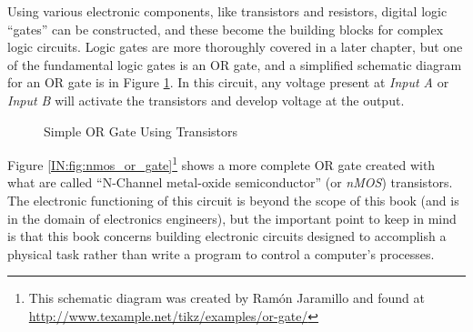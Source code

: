 Using various electronic components, like transistors and resistors, digital logic ``gates'' can be constructed, and these become the building blocks for complex logic circuits. Logic gates are more thoroughly covered in a later chapter, but one of the fundamental logic gates is an \textsf{OR} gate, and a simplified schematic diagram for an \textsf{OR} gate is in Figure \ref{IN:fig:xistor_or_gate}. In this circuit, any voltage present at \emph{Input A} or \emph{Input B} will activate the transistors and develop voltage at the output. 

\begin{figure}[htb]
  \myfloatalign
  \caption{Simple OR Gate Using Transistors}
  \label{IN:fig:xistor_or_gate}
\end{figure}

Figure \ref{IN:fig:nmos_or_gate}\footnote{This schematic diagram was created by Ram\'{o}n Jaramillo and found at \url{http://www.texample.net/tikz/examples/or-gate/}} shows a more complete \textsf{OR} gate created with what are called ``N-Channel metal-oxide semiconductor'' (or \emph{nMOS}) transistors. The electronic functioning of this circuit is beyond the scope of this book (and is in the domain of electronics engineers), but the important point to keep in mind is that this book concerns building electronic circuits designed to accomplish a physical task rather than write a program to control a computer's processes. 

